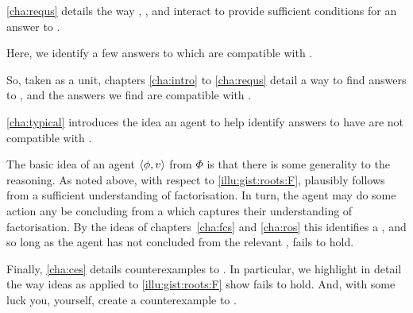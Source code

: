 \begin{note}
  \autoref{cha:requs} details the way , , and \progEx{} interact to provide sufficient conditions for an answer to \qWhy{}.

  Here, we identify a few answers to \qWhy{} which are compatible with \issueInclusion{}.

  So, taken as a unit, chapters \autoref{cha:intro} to \autoref{cha:requs} detail a way to find answers to \qWhy{}, and the answers we find are compatible with \issueInclusion{}.
\end{note}


\begin{note}
  \autoref{cha:typical} introduces the idea an agent \tCV{} to help identify answers to \qWhy{} have are not compatible with \issueInclusion{}.

  The basic idea of an agent \tCV{} \(\langle\phi, v\rangle\) from \(\Phi\) is that there is some generality to the \agents{} reasoning.
  As noted above, with respect to \autoref{illu:gist:roots:F},  plausibly follows from a sufficient understanding of factorisation.
  In turn, the agent may do some action any be concluding  from a \pool{} which captures their understanding of factorisation.
  By the ideas of chapters~\ref{cha:fcs} and \ref{cha:ros} this identifies a \fingfr{}, and so long as the agent has not concluded  from the relevant \pool{}, \issueInclusion{} fails to hold.
\end{note}


\begin{note}
  Finally, \autoref{cha:ces} details counterexamples to \issueInclusion{}.
  In particular, we highlight in detail the way ideas as applied to \autoref{illu:gist:roots:F} show \issueInclusion{} fails to hold.
  And, with some luck you, yourself, create a counterexample to \issueInclusion{}.
\end{note}

